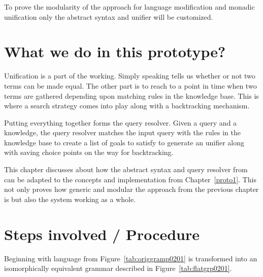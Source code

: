 \documentclass[thesis-solanki.tex]{subfiles}
\begin{document}
To prove the modularity of the approach for language modification and monadic unification only the abstract syntax
and unifier will be customized.



\section{What we do in this prototype?}



Unification is a part of the  working.
Simply speaking  tells us whether or not two terms can be made equal.
The other part is to reach to a point in time when two terms are gathered depending upon matching rules in the
knowledge base.
This is where a search strategy comes into play along with a backtracking mechanism.

Putting everything together forms the  query resolver.
Given a query and a knowledge, the query resolver matches the input query with the rules in the knowledge base to
create a list of goals to satisfy to generate an unifier along with saving choice points on the way for
backtracking.

This chapter discusses about how the abstract syntax and query resolver from \cite{prolog-lib} can be adapted to
the concepts and implementation from Chapter~\ref{proto1}.
This not only proves how generic and modular the approach from the previous chapter is but also the system working
as a whole.



\section{Steps involved / Procedure }

Beginning with language from Figure~\ref{tab:origgramp0201} is transformed into an isomorphically equivalent
grammar described in Figure~\ref{tab:flatgrp0201}.
\end{document}
